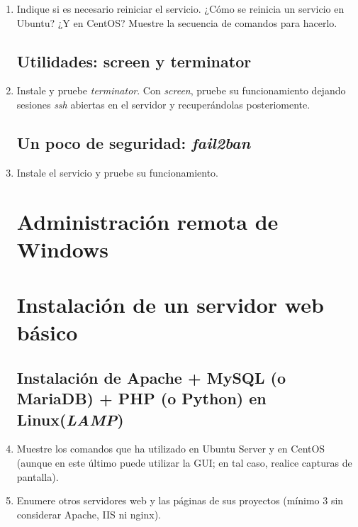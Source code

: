 \documentclass[paper=a4, fontsize=11pt]{scrartcl} %
\numberwithin{equation}{section} %
\numberwithin{figure}{section} %
\numberwithin{table}{section} %
\begin{document}
\begin{enumerate}
	\item Indique si es necesario reiniciar el servicio. ¿Cómo se reinicia un servicio en Ubuntu?
	¿Y en CentOS? Muestre la secuencia de comandos para hacerlo.
	
	\subsection{Utilidades: screen y terminator}
	\item Instale y pruebe \textit{terminator}. Con \textit{screen}, pruebe su funcionamiento dejando
	sesiones \textit{ssh} abiertas en el servidor y recuperándolas posteriomente.
	
	\subsection{Un poco de seguridad: \textit{fail2ban}}
	\item Instale el servicio y pruebe su funcionamiento.
	
	\section{Administración remota de Windows}
	\section{Instalación de un servidor web básico}
	\subsection{Instalación de Apache + MySQL (o MariaDB) + PHP (o Python) en Linux(\textit{LAMP})}
	\item Muestre los comandos que ha utilizado en Ubuntu Server y en CentOS (aunque en este último puede
	utilizar la GUI; en tal caso, realice capturas de pantalla).
	
	
	\item Enumere otros servidores web y las páginas de sus proyectos (mínimo 3 sin considerar Apache,
	IIS ni nginx).
	

\end{enumerate}
\end{document}
